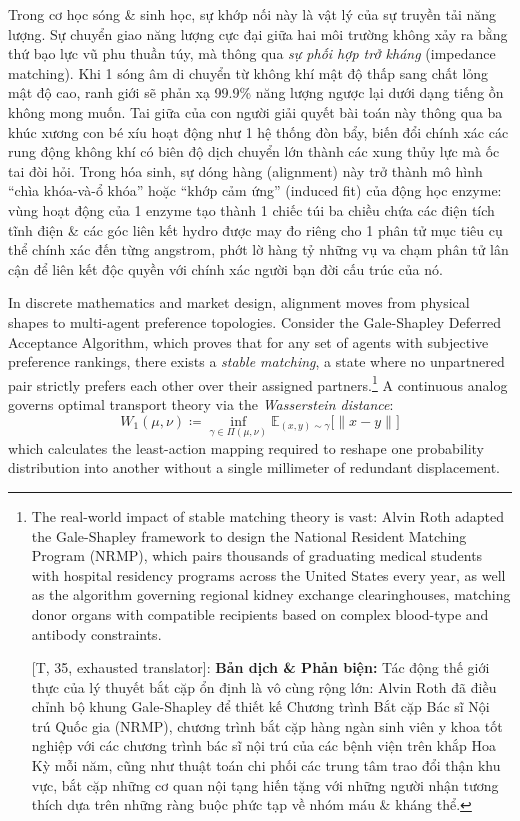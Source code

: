 \documentclass[11pt]{article}
\begin{document}
Trong cơ học sóng \& sinh học, sự khớp nối này là vật lý của sự truyền tải năng lượng. Sự chuyển giao năng lượng cực đại giữa hai môi trường không xảy ra bằng thứ bạo lực vũ phu thuần túy, mà thông qua \emph{sự phối hợp trở kháng} (impedance matching). Khi 1 sóng âm di chuyển từ không khí mật độ thấp sang chất lỏng mật độ cao, ranh giới sẽ phản xạ 99.9\% năng lượng ngược lại dưới dạng tiếng ồn không mong muốn. Tai giữa của con người giải quyết bài toán này thông qua ba khúc xương con bé xíu hoạt động như 1 hệ thống đòn bẩy, biến đổi chính xác các rung động không khí có biên độ dịch chuyển lớn thành các xung thủy lực mà ốc tai đòi hỏi. Trong hóa sinh, sự dóng hàng (alignment) này trở thành mô hình ``chìa khóa-và-ổ khóa'' hoặc ``khớp cảm ứng'' (induced fit) của động học enzyme: vùng hoạt động của 1 enzyme tạo thành 1 chiếc túi ba chiều chứa các điện tích tĩnh điện \& các góc liên kết hydro được may đo riêng cho 1 phân tử mục tiêu cụ thể chính xác đến từng angstrom, phớt lờ hàng tỷ những vụ va chạm phân tử lân cận để liên kết độc quyền với chính xác người bạn đời cấu trúc của nó.

In discrete mathematics and market design, alignment moves from physical shapes to multi-agent preference topologies. Consider the Gale-Shapley Deferred Acceptance Algorithm, which proves that for any set of agents with subjective preference rankings, there exists a \emph{stable matching}, a state where no unpartnered pair strictly prefers each other over their assigned partners.\footnote{The real-world impact of stable matching theory is vast: Alvin Roth adapted the Gale-Shapley framework to design the National Resident Matching Program (NRMP), which pairs thousands of graduating medical students with hospital residency programs across the United States every year, as well as the algorithm governing regional kidney exchange clearinghouses, matching donor organs with compatible recipients based on complex blood-type and antibody constraints.
	
	\textsf{[T, 35, exhausted translator]:} \textbf{Bản dịch \& Phản biện:} Tác động thế giới thực của lý thuyết bắt cặp ổn định là vô cùng rộng lớn: Alvin Roth đã điều chỉnh bộ khung Gale-Shapley để thiết kế Chương trình Bắt cặp Bác sĩ Nội trú Quốc gia (NRMP), chương trình bắt cặp hàng ngàn sinh viên y khoa tốt nghiệp với các chương trình bác sĩ nội trú của các bệnh viện trên khắp Hoa Kỳ mỗi năm, cũng như thuật toán chi phối các trung tâm trao đổi thận khu vực, bắt cặp những cơ quan nội tạng hiến tặng với những người nhận tương thích dựa trên những ràng buộc phức tạp về nhóm máu \& kháng thể.} A continuous analog governs optimal transport theory via the \emph{Wasserstein distance}:
\[ W_1(\mu, \nu)\coloneqq\inf_{\gamma\in\Pi(\mu,\nu)} \mathbb{E}_{(x,y)\sim\gamma} \big[\|x - y\|\big] \]
which calculates the least-action mapping required to reshape one probability distribution into another without a single millimeter of redundant displacement.
\end{document}
